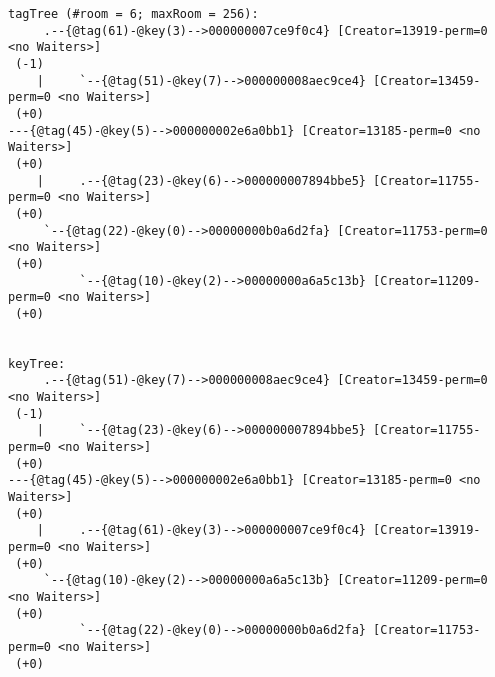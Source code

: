 \begin{indentPar}{1.5cm}
\begin{scriptsize}\begin{verbatim}
tagTree (#room = 6; maxRoom = 256):
     .--{@tag(61)-@key(3)-->000000007ce9f0c4} [Creator=13919-perm=0 <no Waiters>]
 (-1)
    |     `--{@tag(51)-@key(7)-->000000008aec9ce4} [Creator=13459-perm=0 <no Waiters>]
 (+0)
---{@tag(45)-@key(5)-->000000002e6a0bb1} [Creator=13185-perm=0 <no Waiters>]
 (+0)
    |     .--{@tag(23)-@key(6)-->000000007894bbe5} [Creator=11755-perm=0 <no Waiters>]
 (+0)
     `--{@tag(22)-@key(0)-->00000000b0a6d2fa} [Creator=11753-perm=0 <no Waiters>]
 (+0)
          `--{@tag(10)-@key(2)-->00000000a6a5c13b} [Creator=11209-perm=0 <no Waiters>]
 (+0)


keyTree:
     .--{@tag(51)-@key(7)-->000000008aec9ce4} [Creator=13459-perm=0 <no Waiters>]
 (-1)
    |     `--{@tag(23)-@key(6)-->000000007894bbe5} [Creator=11755-perm=0 <no Waiters>]
 (+0)
---{@tag(45)-@key(5)-->000000002e6a0bb1} [Creator=13185-perm=0 <no Waiters>]
 (+0)
    |     .--{@tag(61)-@key(3)-->000000007ce9f0c4} [Creator=13919-perm=0 <no Waiters>]
 (+0)
     `--{@tag(10)-@key(2)-->00000000a6a5c13b} [Creator=11209-perm=0 <no Waiters>]
 (+0)
          `--{@tag(22)-@key(0)-->00000000b0a6d2fa} [Creator=11753-perm=0 <no Waiters>]
 (+0)
\end{verbatim}\end{scriptsize}
\end{indentPar}

